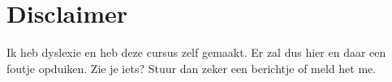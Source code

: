 \documentclass{ximera}
\begin{document}





\section*{Disclaimer}
Ik heb dyslexie en heb deze cursus zelf gemaakt. Er zal dus hier en daar een foutje opduiken. Zie je iets? Stuur dan zeker een berichtje of meld het me.
\end{document}
